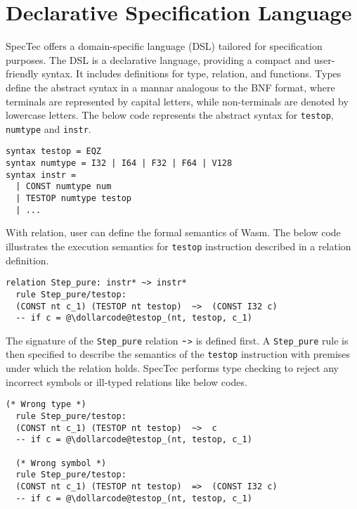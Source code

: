 
\chapter{Declarative Specification Language}
\label{ch:dsl}
\noindent


SpecTec offers a domain-specific language (DSL) tailored for specification
purposes.
The DSL is a declarative language, providing a compact and user-friendly syntax.
It includes definitions for type, relation, and functions.
Types define the abstract syntax in a mannar analogous to the BNF format, where
terminals are represented by capital letters, while non-terminals are denoted
by lowercase letters.
The below code represents the abstract syntax for \texttt{testop},
\texttt{numtype} and \texttt{instr}.
\begin{lstlisting}[style=dsl]
syntax testop = EQZ
syntax numtype = I32 | I64 | F32 | F64 | V128
syntax instr =
  | CONST numtype num
  | TESTOP numtype testop
  | ...
\end{lstlisting}


With relation, user can define the formal semantics of Wasm.
The below code illustrates the execution semantics for \texttt{testop}
instruction described in a relation definition.
\begin{lstlisting}[style=dsl]
  relation Step_pure: instr* ~> instr*
  rule Step_pure/testop:
  (CONST nt c_1) (TESTOP nt testop)  ~>  (CONST I32 c)
  -- if c = @\dollarcode@testop_(nt, testop, c_1)
\end{lstlisting}
The signature of the \texttt{Step\_pure} relation $\tildecode$\texttt{>} is
defined first.
A \texttt{Step\_pure} rule is then specified to describe the semantics of the
\texttt{testop} instruction with premises under which the relation holds.
SpecTec performs type checking to reject any incorrect symbols or ill-typed
relations like below codes.
\begin{lstlisting}[style=dsl]
  (* Wrong type *)
  rule Step_pure/testop:
  (CONST nt c_1) (TESTOP nt testop)  ~>  c
  -- if c = @\dollarcode@testop_(nt, testop, c_1)

  (* Wrong symbol *)
  rule Step_pure/testop:
  (CONST nt c_1) (TESTOP nt testop)  =>  (CONST I32 c)
  -- if c = @\dollarcode@testop_(nt, testop, c_1)
\end{lstlisting}


